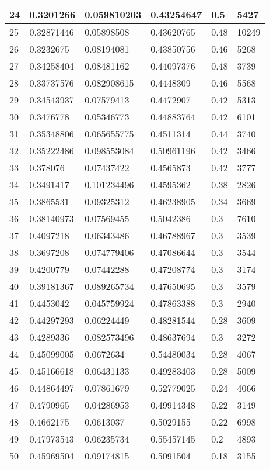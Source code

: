 \begin{longtable}{|l|l|l|l|l|l|}
24 & 0.3201266 & 0.059810203 & 0.43254647 & 0.5 & 5427 \\ \hline 
25 & 0.32871446 & 0.05898508 & 0.43620765 & 0.48 & 10249 \\ \hline 
26 & 0.3232675 & 0.08194081 & 0.43850756 & 0.46 & 5268 \\ \hline 
27 & 0.34258404 & 0.08481162 & 0.44097376 & 0.48 & 3739 \\ \hline 
28 & 0.33737576 & 0.082908615 & 0.4448309 & 0.46 & 5568 \\ \hline 
29 & 0.34543937 & 0.07579413 & 0.4472907 & 0.42 & 5313 \\ \hline 
30 & 0.3476778 & 0.05346773 & 0.44883764 & 0.42 & 6101 \\ \hline 
31 & 0.35348806 & 0.065655775 & 0.4511314 & 0.44 & 3740 \\ \hline 
32 & 0.35222486 & 0.098553084 & 0.50961196 & 0.42 & 3466 \\ \hline 
33 & 0.378076 & 0.07437422 & 0.4565873 & 0.42 & 3777 \\ \hline 
34 & 0.3491417 & 0.101234496 & 0.4595362 & 0.38 & 2826 \\ \hline 
35 & 0.3865531 & 0.09325312 & 0.46238905 & 0.34 & 3669 \\ \hline 
36 & 0.38140973 & 0.07569455 & 0.5042386 & 0.3 & 7610 \\ \hline 
37 & 0.4097218 & 0.06343486 & 0.46788967 & 0.3 & 3539 \\ \hline 
38 & 0.3697208 & 0.074779406 & 0.47086644 & 0.3 & 3544 \\ \hline 
39 & 0.4200779 & 0.07442288 & 0.47208774 & 0.3 & 3174 \\ \hline 
40 & 0.39181367 & 0.089265734 & 0.47650695 & 0.3 & 3579 \\ \hline 
41 & 0.4453042 & 0.045759924 & 0.47863388 & 0.3 & 2940 \\ \hline 
42 & 0.44297293 & 0.06224449 & 0.48281544 & 0.28 & 3609 \\ \hline 
43 & 0.4289336 & 0.082573496 & 0.48637694 & 0.3 & 3272 \\ \hline 
44 & 0.45099005 & 0.0672634 & 0.54480034 & 0.28 & 4067 \\ \hline 
45 & 0.45166618 & 0.06431133 & 0.49283403 & 0.28 & 5009 \\ \hline 
46 & 0.44864497 & 0.07861679 & 0.52779025 & 0.24 & 4066 \\ \hline 
47 & 0.4790965 & 0.04286953 & 0.49914348 & 0.22 & 3149 \\ \hline 
48 & 0.4662175 & 0.0613037 & 0.5029155 & 0.22 & 6998 \\ \hline 
49 & 0.47973543 & 0.06235734 & 0.55457145 & 0.2 & 4893 \\ \hline 
50 & 0.45969504 & 0.09174815 & 0.5091504 & 0.18 & 3155 \\ \hline 
\end{longtable}
